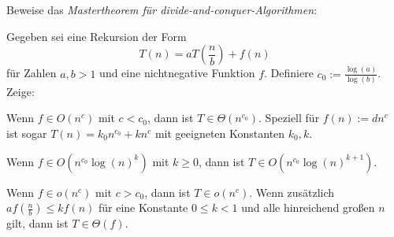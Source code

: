 
\begin{sheet}

\begin{problem}[title={Mastertheorem}]\label{ex:mastertheorem}
Beweise das \emph{Mastertheorem für divide-and-conquer-Algorithmen}:

Gegeben sei eine Rekursion der Form
\[T(n) = a T\left(\frac{n}{b}\right) + f(n)\]
für Zahlen $a,b>1$ und eine nichtnegative Funktion $f$. Definiere $c_0 := \frac{\log(a)}{\log(b)}$. Zeige:
\begin{subproblem}[difficulty={leicht}]
Wenn $f\in O(n^c)$ mit $c<c_0$, dann ist $T\in\Theta(n^{c_0})$. Speziell für $f(n) := d n^c$ ist sogar $T(n) = k_0 n^{c_0} + k n^c$ mit geeigneten Konstanten $k_0,k$.
\end{subproblem}
\begin{subproblem}[difficulty={leicht}]
Wenn $f\in O(n^{c_0}\log(n)^k)$ mit $k\geq 0$, dann ist $T\in O(n^{c_0} \log(n)^{k+1})$.
\end{subproblem}
\begin{subproblem}[difficulty={mittel}]
Wenn $f\in o(n^c)$ mit $c>c_0$, dann ist $T\in o(n^c)$. Wenn zusätzlich $a f(\frac{n}{b})\leq k f(n)$ für eine Konstante $0\leq k<1$ und alle hinreichend großen $n$ gilt, dann ist $T\in\Theta(f)$.
\end{subproblem}
\end{problem}

\end{sheet}